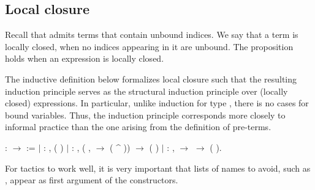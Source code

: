 \documentclass[12pt]{report}
\begin{document}
\subsection{Local closure}



 Recall that  admits terms that contain unbound indices. 
    We say that a term is locally closed, 
    when no indices appearing in it are unbound.  The proposition 
      holds when an expression  is locally closed.


    The inductive definition below formalizes local closure such that
    the resulting induction principle serves as the structural
    induction principle over (locally closed) expressions.  In
    particular, unlike induction for type , there is no cases
    for bound variables.  Thus, the induction principle corresponds more
    closely to informal practice than the one arising from the
    definition of pre-terms.

\begin{coqdoccode}
\coqdocemptyline
\coqdocnoindent
{}  :  \ensuremath{\rightarrow}  :=\coqdoceol
\coqdocindent{1.00em}
\ensuremath{|}  : \coqdockw{\ensuremath{\forall}} ,\coqdoceol
\coqdocindent{3.00em}
 ( )\coqdoceol
\coqdocindent{1.00em}
\ensuremath{|}  : \coqdockw{\ensuremath{\forall}}  ,\coqdoceol
\coqdocindent{3.00em}
(\coqdockw{\ensuremath{\forall}} ,    \ensuremath{\rightarrow}  ( \^{} )) \ensuremath{\rightarrow}\coqdoceol
\coqdocindent{3.00em}
 ( )\coqdoceol
\coqdocindent{1.00em}
\ensuremath{|}  : \coqdockw{\ensuremath{\forall}}  ,\coqdoceol
\coqdocindent{3.00em}
  \ensuremath{\rightarrow} \coqdoceol
\coqdocindent{3.00em}
  \ensuremath{\rightarrow} \coqdoceol
\coqdocindent{3.00em}
 (  ).\coqdoceol
\coqdocemptyline
\end{coqdoccode}
For tactics to work well, it is very important that lists of
    names to avoid, such as , appear as first argument of the
    constructors. 
\end{document}
